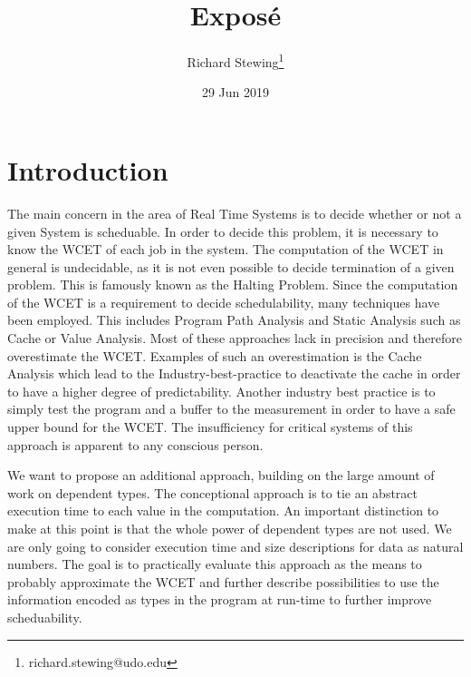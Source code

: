 \documentclass[11pt]{article}
\author{Richard Stewing\thanks{richard.stewing@udo.edu}}
\date{29 Jun 2019}
\title{Exposé}
\begin{document}
\maketitle
\begin{acronym}
\end{acronym}

\section{Introduction}
\label{sec:orgb8f2fd2}
The main concern in the area of Real Time Systems is to decide whether or not
a given System is scheduable. 
In order to decide this problem, it is necessary to know the \ac{WCET} of each
job in the system. 
The computation of the \ac{WCET} in general is undecidable, as it is not even 
possible to decide termination of a given problem. 
This is famously known as the Halting Problem. 
Since the computation of the \ac{WCET} is a requirement to decide 
schedulability, many techniques have been employed. 
This includes Program Path Analysis and Static Analysis such as 
Cache or Value Analysis.
Most of these approaches lack in precision and therefore overestimate the 
\ac{WCET}. 
Examples of such an overestimation is the Cache Analysis which lead to the 
Industry-best-practice to deactivate the cache in order to have a higher 
degree of predictability. 
Another industry best practice is to simply test the program and a buffer 
to the measurement in order to have a safe upper bound for the \ac{WCET}. 
The insufficiency for critical systems of this approach is apparent to any 
conscious person. 

We want to propose an additional approach, building on the large amount of 
work on dependent types. 
The conceptional approach is to tie an abstract execution time to each value
in the computation.
An important distinction to make at this point is that the whole power 
of dependent types are not used. 
We are only going to consider execution time and size descriptions for data
as natural numbers.
The goal is to practically evaluate this approach as the means to probably 
approximate the \ac{WCET} and further describe possibilities to use the 
information encoded as types in the program at run-time to further improve 
scheduability. 
\end{document}
